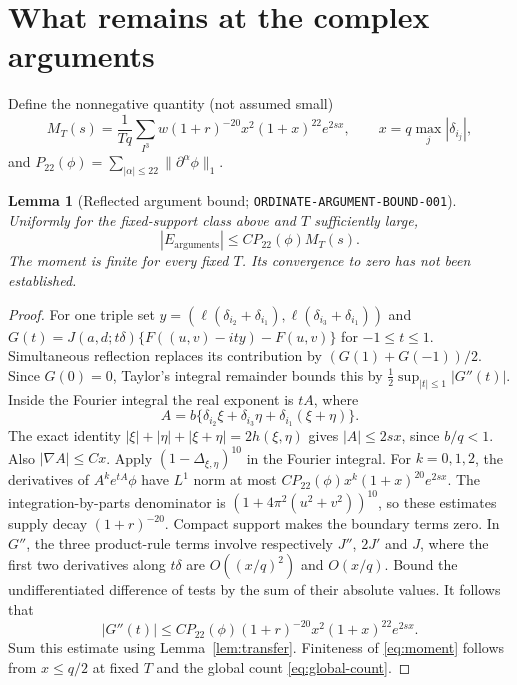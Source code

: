 \documentclass[11pt]{article}
\newtheorem{lemma}{Lemma}
\newcommand{\Ea}{E_{\mathrm{arguments}}}
\begin{document}
\section{What remains at the complex arguments}
Define the nonnegative quantity (not assumed small)
\begin{equation}\label{eq:moment}
 M_T(s)=\frac1{Tq}\sum_{I^3}w(1+r)^{-20}
 x^2(1+x)^{22}e^{2sx},\qquad x=q\max_j|\delta_{i_j}|,
\end{equation}
and $P_{22}(\phi)=\sum_{|\alpha|\leq22}\|\partial^\alpha\phi\|_1$.
\begin{lemma}[Reflected argument bound; \texttt{ORDINATE-ARGUMENT-BOUND-001}]
\label{lem:arguments}
Uniformly for the fixed-support class above and $T$ sufficiently large,
\begin{equation}\label{eq:argument-bound}
 |\Ea|\leq C P_{22}(\phi)M_T(s).
\end{equation}
The moment is finite for every fixed $T$. Its convergence to zero has
not been established.
\end{lemma}
\begin{proof}
For one triple set $y=(\ell(\delta_{i_2}+\delta_{i_1}),
\ell(\delta_{i_3}+\delta_{i_1}))$ and
$G(t)=J(a,d;t\delta)\{F((u,v)-ity)-F(u,v)\}$ for $-1\leq t\leq1$.
Simultaneous reflection replaces its contribution by
$(G(1)+G(-1))/2$. Since $G(0)=0$, Taylor's integral remainder bounds
this by $\tfrac12\sup_{|t|\leq1}|G''(t)|$.
Inside the Fourier integral the real exponent is $tA$, where
\[
 A=b\{\delta_{i_2}\xi+\delta_{i_3}\eta+
                   \delta_{i_1}(\xi+\eta)\}.
\]
The exact identity $|\xi|+|\eta|+|\xi+\eta|=2h(\xi,\eta)$ gives
$|A|\leq2sx$, since $b/q<1$. Also $|\nabla A|\leq Cx$.
Apply $(1-\Delta_{\xi,\eta})^{10}$ in the Fourier integral.
For $k=0,1,2$, the derivatives of $A^ke^{tA}\phi$ have $L^1$ norm
at most $CP_{22}(\phi)x^k(1+x)^{20}e^{2sx}$.
The integration-by-parts denominator is
$(1+4\pi^2(u^2+v^2))^{10}$, so these estimates supply decay
$(1+r)^{-20}$. Compact support makes the boundary terms zero.
In $G''$, the three product-rule terms involve respectively $J''$,
$2J'$ and $J$, where the first two derivatives along $t\delta$ are
$O((x/q)^2)$ and $O(x/q)$. Bound the undifferentiated difference
of tests by the sum of their absolute values. It follows that
\[
 |G''(t)|\leq CP_{22}(\phi)(1+r)^{-20}
                  x^2(1+x)^{22}e^{2sx}.
\]
Sum this estimate using Lemma~\ref{lem:transfer}. Finiteness of
\eqref{eq:moment} follows from $x\leq q/2$ at fixed $T$ and the
global count \eqref{eq:global-count}.
\end{proof}
\end{document}
